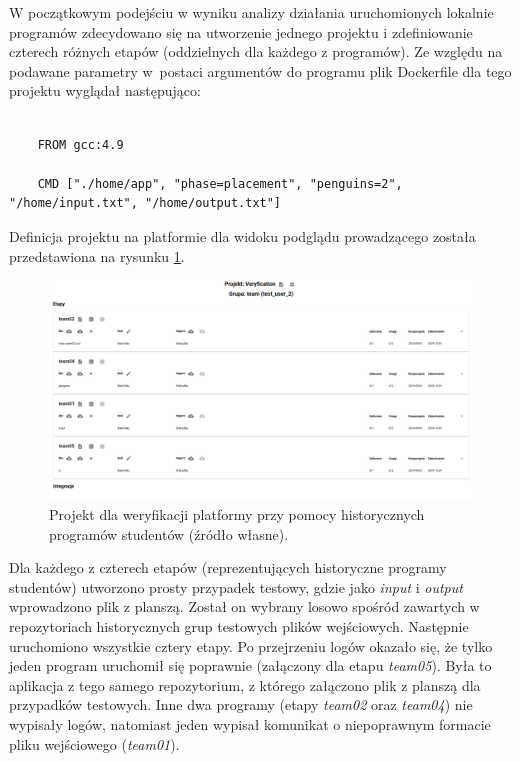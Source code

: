 W początkowym podejściu w wyniku analizy działania uruchomionych lokalnie programów zdecydowano się na utworzenie jednego projektu i zdefiniowanie czterech różnych etapów (oddzielnych dla każdego z programów).
Ze względu na podawane parametry w~postaci argumentów do programu plik Dockerfile dla tego projektu wyglądał następująco:

{\selectfont
\tiny
\begin{lstlisting}

    FROM gcc:4.9

    CMD ["./home/app", "phase=placement", "penguins=2", "/home/input.txt", "/home/output.txt"]

\end{lstlisting}
}

Definicja projektu na platformie dla widoku podglądu prowadzącego została przedstawiona na rysunku \ref{fig:veryfication_first_project}.

\begin{figure}[h]
    \centering
    \includegraphics[width = 12cm]{chapter06/veryfication_first_project.png}
    \caption{Projekt dla weryfikacji platformy przy pomocy historycznych programów studentów (źródło własne).}
    \label{fig:veryfication_first_project}
\end{figure}

Dla każdego z czterech etapów (reprezentujących historyczne programy studentów) utworzono prosty przypadek testowy, gdzie jako \textit{input} i \textit{output} wprowadzono plik z planszą.
Został on wybrany losowo spośród zawartych w repozytoriach historycznych grup testowych plików wejściowych.
Następnie uruchomiono wszystkie cztery etapy.
Po przejrzeniu logów okazało się, że tylko jeden program uruchomił się poprawnie (załączony dla etapu \textit{team05}).
Była to aplikacja z tego samego repozytorium, z którego załączono plik z planszą dla przypadków testowych.
Inne dwa programy (etapy \textit{team02} oraz \textit{team04}) nie wypisały logów, natomiast jeden wypisał komunikat o niepoprawnym formacie pliku wejściowego (\textit{team01}).

